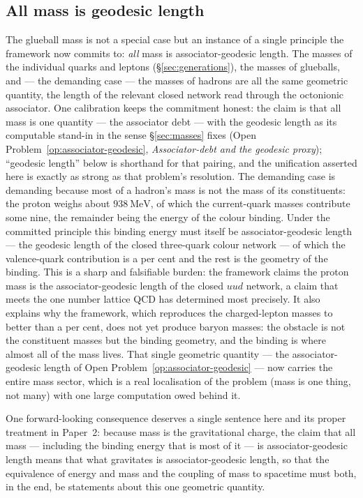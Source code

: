 \subsection{All mass is geodesic length}

The glueball mass is not a special case but an instance of a single principle the framework now
commits to: \emph{all} mass is associator-geodesic length. The masses of the individual quarks and
leptons (\S\ref{sec:generations}), the masses of glueballs, and --- the demanding case --- the masses
of hadrons are all the same geometric quantity, the length of the relevant closed network read
through the octonionic associator. One calibration keeps the commitment honest: the claim is that
all mass is one quantity --- the associator debt --- with the geodesic length as its computable
stand-in in the sense \S\ref{sec:masses} fixes (Open Problem~\ref{op:associator-geodesic},
\emph{Associator-debt and the geodesic proxy}); ``geodesic length'' below is shorthand for that
pairing, and the unification asserted here is exactly as strong as that problem's resolution. The demanding case is demanding because most of a hadron's mass is
not the mass of its constituents: the proton weighs about $938\ \mathrm{MeV}$, of which the
current-quark masses contribute some nine, the remainder being the energy of the colour binding. Under
the committed principle this binding energy must itself be associator-geodesic length --- the geodesic
length of the closed three-quark colour network --- of which the valence-quark contribution is a per
cent and the rest is the geometry of the binding. This is a sharp and falsifiable burden: the
framework claims the proton mass is the associator-geodesic length of the closed $uud$ network, a
claim that meets the one number lattice QCD has determined most precisely. It also explains why the
framework, which reproduces the charged-lepton masses to better than a per cent, does not yet produce
baryon masses: the obstacle is not the constituent masses but the binding geometry, and the binding is
where almost all of the mass lives. That single geometric quantity --- the associator-geodesic length
of Open Problem~\ref{op:associator-geodesic} --- now carries the entire mass sector, which is a real
localisation of the problem (mass is one thing, not many) with one large computation owed behind it.

One forward-looking consequence deserves a single sentence here and its proper treatment in Paper~2:
because mass is the gravitational charge, the claim that all mass --- including the binding energy that
is most of it --- is associator-geodesic length means that what gravitates is associator-geodesic
length, so that the equivalence of energy and mass and the coupling of mass to spacetime must both, in
the end, be statements about this one geometric quantity.

